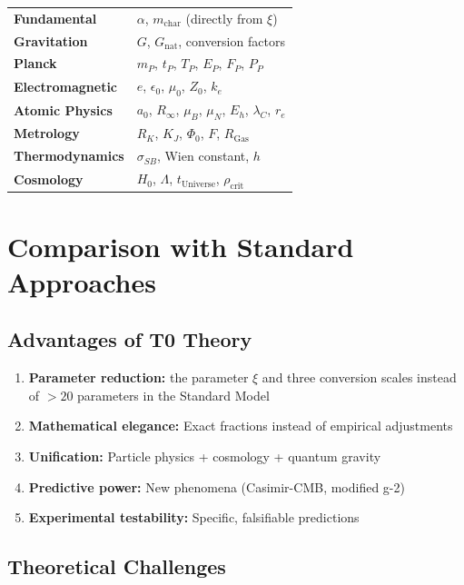 	\begin{center}
		\begin{tabular}{ll}
			\textbf{Fundamental} & $\alpha$, $m_{\text{char}}$ (directly from $\xi$) \\
			\textbf{Gravitation} & $G$, $G_{\text{nat}}$, conversion factors \\
			\textbf{Planck} & $m_P$, $t_P$, $T_P$, $E_P$, $F_P$, $P_P$ \\
			\textbf{Electromagnetic} & $e$, $\epsilon_0$, $\mu_0$, $Z_0$, $k_e$ \\
			\textbf{Atomic Physics} & $a_0$, $R_\infty$, $\mu_B$, $\mu_N$, $E_h$, $\lambda_C$, $r_e$ \\
			\textbf{Metrology} & $R_K$, $K_J$, $\Phi_0$, $F$, $R_{\text{Gas}}$ \\
			\textbf{Thermodynamics} & $\sigma_{SB}$, Wien constant, $h$ \\
			\textbf{Cosmology} & $H_0$, $\Lambda$, $t_{\text{Universe}}$, $\rho_{\text{crit}}$ \\
		\end{tabular}
	\end{center}
	
	\section{Comparison with Standard Approaches}
	
	\subsection{Advantages of T0 Theory}
	
	\begin{enumerate}
		\item \textbf{Parameter reduction:} the parameter $\xi$ and three conversion scales instead of $>20$ parameters in the Standard Model
		\item \textbf{Mathematical elegance:} Exact fractions instead of empirical adjustments
		\item \textbf{Unification:} Particle physics + cosmology + quantum gravity
		\item \textbf{Predictive power:} New phenomena (Casimir-CMB, modified g-2)
		\item \textbf{Experimental testability:} Specific, falsifiable predictions
	\end{enumerate}
	
	\subsection{Theoretical Challenges}
	
